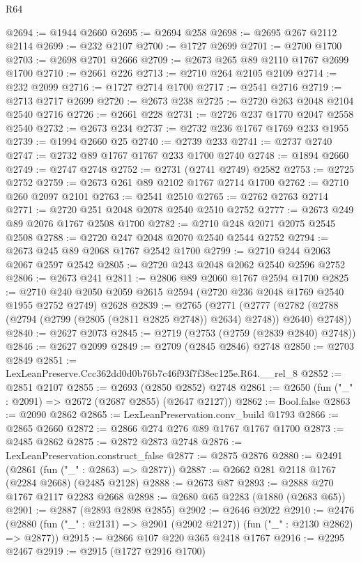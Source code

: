 \begin{lexlean}{R64}
\begin{coremodule}
@2694 := @1944 @2660
@2695 := @2694 @258
@2698 := @2695 @267 @2112 @2114
@2699 := @232 @2107
@2700 := @1727 @2699
@2701 := @2700 @1700
@2703 := @2698 @2701 @2666
@2709 := @2673 @265 @89 @2110 @1767 @2699 @1700
@2710 := @2661 @226
@2713 := @2710 @264 @2105 @2109
@2714 := @232 @2099
@2716 := @1727 @2714 @1700
@2717 := @2541 @2716
@2719 := @2713 @2717 @2699
@2720 := @2673 @238
@2725 := @2720 @263 @2048 @2104 @2540 @2716
@2726 := @2661 @228
@2731 := @2726 @237 @1770 @2047 @2558 @2540
@2732 := @2673 @234
@2737 := @2732 @236 @1767 @1769 @233 @1955
@2739 := @1994 @2660 @25
@2740 := @2739 @233
@2741 := @2737 @2740
@2747 := @2732 @89 @1767 @1767 @233 @1700 @2740
@2748 := @1894 @2660
@2749 := @2747 @2748
@2752 := @2731 (@2741 @2749) @2582
@2753 := @2725 @2752
@2759 := @2673 @261 @89 @2102 @1767 @2714 @1700
@2762 := @2710 @260 @2097 @2101
@2763 := @2541 @2510
@2765 := @2762 @2763 @2714
@2771 := @2720 @251 @2048 @2078 @2540 @2510 @2752
@2777 := @2673 @249 @89 @2076 @1767 @2508 @1700
@2782 := @2710 @248 @2071 @2075 @2545 @2508
@2788 := @2720 @247 @2048 @2070 @2540 @2544 @2752
@2794 := @2673 @245 @89 @2068 @1767 @2542 @1700
@2799 := @2710 @244 @2063 @2067 @2597 @2542
@2805 := @2720 @243 @2048 @2062 @2540 @2596 @2752
@2806 := @2673 @241
@2811 := @2806 @89 @2060 @1767 @2594 @1700
@2825 := @2710 @240 @2050 @2059 @2615 @2594 (@2720 @236 @2048 @1769 @2540 @1955 @2752 @2749) @2628
@2839 := @2765
    (@2771
      (@2777 (@2782 (@2788 (@2794 (@2799 (@2805 (@2811 @2825 @2748)) @2634) @2748)) @2640) @2748))
@2840 := @2627 @2073
@2845 := @2719 (@2753 (@2759 (@2839 @2840) @2748))
@2846 := @2627 @2099
@2849 := @2709 (@2845 @2846) @2748
@2850 := @2703 @2849
@2851 := LexLeanPreserve.Ccc362dd0d0b76b7c46f93f7f38ec125e.R64.__rel_8
@2852 := @2851 @2107
@2855 := @2693 (@2850 @2852) @2748
@2861 := @2650 (fun ("_" : @2091) => @2672 (@2687 @2855) (@2647 @2127))
@2862 := Bool.false
@2863 := @2090 @2862
@2865 := LexLeanPreservation.conv_build @1793
@2866 := @2865 @2660
@2872 := @2866 @274 @276 @89 @1767 @1767 @1700
@2873 := @2485 @2862
@2875 := @2872 @2873 @2748
@2876 := LexLeanPreservation.construct_false
@2877 := @2875 @2876
@2880 := @2491 (@2861 (fun ("_" : @2863) => @2877))
@2887 := @2662 @281 @2118 @1767 (@2284 @2668) (@2485 @2128)
@2888 := @2673 @87
@2893 := @2888 @270 @1767 @2117 @2283 @2668
@2898 := @2680 @65 @2283 (@1880 (@2683 @65))
@2901 := @2887 (@2893 @2898 @2855)
@2902 := @2646 @2022
@2910 := @2476 (@2880 (fun ("_" : @2131) => @2901 (@2902 @2127)) (fun ("_" : @2130 @2862) => @2877))
@2915 := @2866 @107 @220 @365 @2418 @1767
@2916 := @2295 @2467
@2919 := @2915 (@1727 @2916 @1700)

\end{coremodule}
\end{lexlean}
